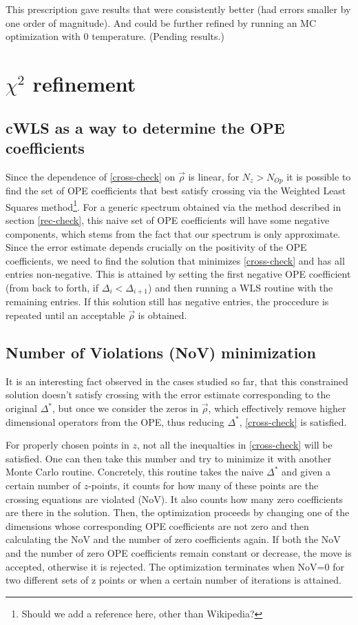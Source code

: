 \documentclass[letterpaper]{article}
\numberwithin{equation}{section}
\begin{document}
This prescription gave results that were consistently better (had errors smaller
by one order of magnitude). And could be further refined by running an MC
optimization with 0 temperature. (Pending results.)

\section{$\chi^2$ refinement}
\subsection{cWLS as a way to determine the OPE coefficients}
\label{cWLS}
Since the dependence of \ref{cross-check} on $\vec{\rho}$ is linear, for
$N_z>N_{Op}$ it is possible to find the set of OPE coefficients that best
satisfy crossing via the Weighted Least Squares method\footnote{Should we add a
reference here, other than Wikipedia?}. 
For a generic spectrum
obtained via the method described in section \ref{rec-check}, this naive set of OPE
coefficients will have some negative components, which stems from the
fact that our spectrum is only approximate. Since the error estimate
\label{finalest4}
depends
crucially on the positivity of the OPE coefficients, we need to find the
solution that minimizes \ref{cross-check} and has all entries non-negative. This
is attained by setting the first negative OPE coefficient (from back to forth,
if $\Delta_i<\Delta_{i+1}$) and then running a WLS routine with the remaining
entries. If this solution still has negative entries, the proccedure is repeated
until an acceptable $\vec{\rho}$ is obtained.


\subsection{Number of Violations (NoV) minimization}
It is an interesting fact observed in the cases studied so far, that this
constrained solution doesn't satisfy crossing with the error estimate
corresponding to the original $\Delta^*$, but once we consider the zeros in
$\vec{\rho}$, which effectively remove higher dimensional operators from the
OPE, thus reducing $\Delta^*$, \ref{cross-check} is satisfied.

For properly chosen
points in $z$, not all the inequalties in \ref{cross-check} will be satisfied.
One can then take this number and try to minimize it with another Monte Carlo
routine. Concretely, this routine takes the naive $\Delta^*$ and given a certain
number of $z$-points, it counts for how many of these points are the crossing
equations are violated (NoV). It also counts how many zero coefficients are there in
the solution. Then, the optimization proceeds by changing one of the dimensions
whose corresponding OPE coefficients are not zero and then calculating the NoV
and the number of zero coefficients again. If both the NoV and the number of
zero OPE coefficients remain constant or decrease, the move is accepted,
otherwise it is rejected. The optimization terminates when NoV=0 for two
different sets of z points or when a certain number of iterations is attained.
\end{document}
